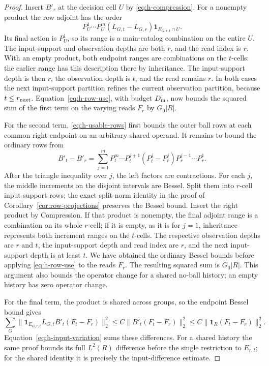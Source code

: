 \begin{proof}
Insert \(B'_r\) at the decision cell \(U\) by
\eqref{eq:h-compression}.  For a nonempty product the row adjoint
has the order
\[
 P_U^1\cdots P_U^m(L_{G,t}-L_{G,r})
                         \mathbf1_{E_{G,r,t}\cap U}.
\]
Its final action is \(P_U^1\), so its range is a main-catalog
combination on the entire \(U\).  The input-support and observation
depths are both \(r\), and the read index is \(r\).  With an empty
product, both endpoint ranges are combinations on the \(t\)-cells:
the earlier range has this description there by inheritance.
The input-support depth is then \(r\), the observation depth is
\(t\), and the read remains \(r\).  In both cases the next
input-support partition refines the current observation partition,
because \(t\le r_{\rm next}\).  Equation~\eqref{eq:h-row-use}, with
budget \(D_{\rm m}\), now bounds the squared sum of the first term
on the varying reads \(F_r\) by \(G_0|R|\).

For the second term, \eqref{eq:h-usable-rows} first bounds the
outer ball rows at each common right endpoint on an arbitrary
shared operand.  It remains to bound the ordinary rows from
\[
 B'_t-B'_r
 =\sum_{j=1}^m P_t^m\cdots P_t^{j+1}
              (P_t^j-P_r^j)P_r^{j-1}\cdots P_r^1.
\]
After the triangle inequality over \(j\), the left factors are
contractions.  For each \(j\), the middle increments on the disjoint intervals are
Bessel.  Split them into \(r\)-cell input-support rows; the exact
split-norm identity in the proof of Corollary~\ref{cor:row-projections}
preserves the Bessel bound.  Insert the right product by Compression.
If that product is nonempty,
the final adjoint range is a combination on its whole \(r\)-cell;
if it is empty, as it is for \(j=1\), inheritance represents both
increment ranges on the \(t\)-cells.  The respective observation
depths are \(r\) and \(t\), the input-support depth and read index
are \(r\), and the next input-support depth is at least \(t\).
We have obtained the ordinary Bessel bounds before applying
\eqref{eq:h-row-use} to the reads \(F_r\).  The resulting squared
sum is \(G_0|R|\).  This argument also bounds the operator change
for a shared no-ball history; an empty history has zero operator
change.

For the final term, the product is shared across groups, so the
endpoint Bessel bound gives
\[
 \sum_G\|\mathbf1_{E_{G,r,t}}L_{G,t}B'_t(F_t-F_r)\|_2^2
 \le C\|B'_t(F_t-F_r)\|_2^2
 \le C\|\mathbf1_R(F_t-F_r)\|_2^2.
\]
Equation~\eqref{eq:h-input-variation} sums these differences.
For a shared history the same proof bounds its full \(L^2(R)\)
difference before the single restriction to \(E_{r,t}\); for the
shared identity it is precisely the input-difference estimate.


\end{proof}
